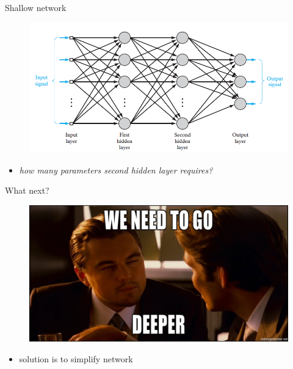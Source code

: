 \documentclass{beamer}
\begin{document}
\begin{frame}{Shallow network}

\begin{figure}[h!]
  \centering
  \includegraphics[width=1\textwidth]{images/mlp.png}
\end{figure}

\begin{itemize}
\item \textit{how many parameters second hidden layer requires?}
\end{itemize}

\end{frame}


\begin{frame}{What next?}

\begin{figure}[h!]
  \centering
  \includegraphics[width=1\textwidth]{images/inception.png}
\end{figure}

\begin{itemize}
\item solution is to simplify network
\end{itemize}

\end{frame}
\end{document}
